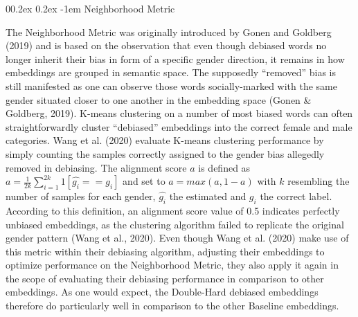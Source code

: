 \documentclass[
  english,
  man,floatsintext]{apa6}
\makeatletter
\let\oldparagraph\paragraph
\renewcommand{\paragraph}[1]{\oldparagraph{#1}\mbox{}}
\renewcommand{\paragraph}{\@startsection{paragraph}{4}{\parindent}%
  {0\baselineskip \@plus 0.2ex \@minus 0.2ex}%
  {-1em}%
  {\normalfont\normalsize\bfseries\itshape\typesectitle}}
\makeatother
\begin{document}
\hypertarget{neighborhood-metric}{%
\paragraph{Neighborhood Metric}\label{neighborhood-metric}}

The Neighborhood Metric was originally introduced by Gonen and Goldberg (2019) and is based on the observation that even though debiased words no longer inherit their bias in form of a specific gender direction, it remains in how embeddings are grouped in semantic space. The supposedly ``removed'' bias is still manifested as one can observe those words socially-marked with the same gender situated closer to one another in the embedding space (Gonen \& Goldberg, 2019).
K-means clustering on a number of most biased words can often straightforwardly cluster ``debiased'' embeddings into the correct female and male categories.
Wang et al. (2020) evaluate K-means clustering performance by simply counting the samples correctly assigned to the gender bias allegedly removed in debiasing. The alignment score \(a\) is defined as \(a = \frac{1}{2k}\sum_{i=1}^{2k}1[\hat{g_{i}}== g_{i}]\) and set to \(a = max(a, 1-a)\) with \(k\) resembling the number of samples for each gender, \(\hat{g_{i}}\) the estimated and \(g_{i}\) the correct label. According to this definition, an alignment score value of 0.5 indicates perfectly unbiased embeddings, as the clustering algorithm failed to replicate the original gender pattern (Wang et al., 2020).
Even though Wang et al. (2020) make use of this metric within their debiasing algorithm, adjusting their embeddings to optimize performance on the Neighborhood Metric, they also apply it again in the scope of evaluating their debiasing performance in comparison to other embeddings. As one would expect, the Double-Hard debiased embeddings therefore do particularly well in comparison to the other Baseline embeddings.
\end{document}
